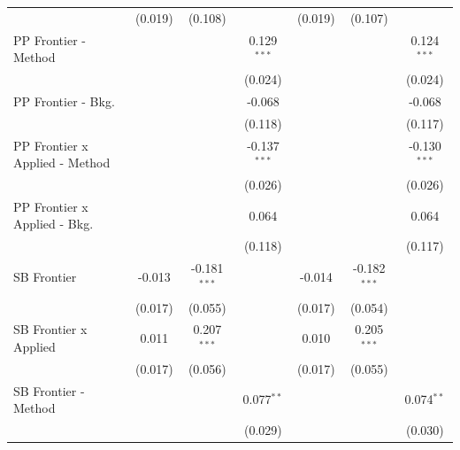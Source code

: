 \begin{tabular}{lcccccc}
                                  & (0.019)        & (0.108)        &                & (0.019)        & (0.107)        &   \\   
   PP Frontier - Method           &                &                & 0.129$^{***}$  &                &                & 0.124$^{***}$\\   
                                  &                &                & (0.024)        &                &                & (0.024)\\   
   PP Frontier - Bkg.             &                &                & -0.068         &                &                & -0.068\\   
                                  &                &                & (0.118)        &                &                & (0.117)\\   
   PP Frontier x Applied - Method &                &                & -0.137$^{***}$ &                &                & -0.130$^{***}$\\   
                                  &                &                & (0.026)        &                &                & (0.026)\\   
   PP Frontier x Applied - Bkg.   &                &                & 0.064          &                &                & 0.064\\   
                                  &                &                & (0.118)        &                &                & (0.117)\\   
   SB Frontier                    & -0.013         & -0.181$^{***}$ &                & -0.014         & -0.182$^{***}$ &   \\   
                                  & (0.017)        & (0.055)        &                & (0.017)        & (0.054)        &   \\   
   SB Frontier x Applied          & 0.011          & 0.207$^{***}$  &                & 0.010          & 0.205$^{***}$  &   \\   
                                  & (0.017)        & (0.056)        &                & (0.017)        & (0.055)        &   \\   
   SB Frontier - Method           &                &                & 0.077$^{**}$   &                &                & 0.074$^{**}$\\   
                                  &                &                & (0.029)        &                &                & (0.030)\\   

\end{tabular}
